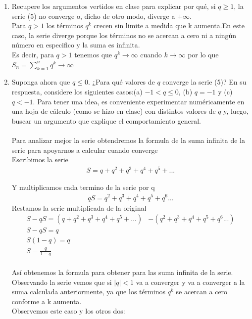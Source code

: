 \documentclass[12pt]{article}
\begin{document}
    \begin{enumerate}
    
        \item Recupere los argumentos vertidos en clase para explicar por qué, si $q \geq 1$, la serie (5) no converge o, dicho de otro modo, diverge a $+\infty$.\\
            Para $q>1$ los términos $q^k$ crecen sin limite a medida que k aumenta.En este caso, la serie diverge porque los términos no se acercan a cero ni a ningún número en especifico y la suma es infinita.\\
Es decir, para $q>1$ tenemos que $q^k \rightarrow \infty$ cuando $k\rightarrow \infty$ por lo que $S_n = \sum_{k=1}^{n} q^k \rightarrow \infty$
    

        \item Suponga ahora que $q \leq 0$. ¿Para qué valores de $q$ converge la serie (5)? En su respuesta, considere los siguientes casos:(a) $-1 < q \leq 0$, (b) $q = -1$ y (c)$q < -1$. Para tener una idea, es conveniente experimentar numéricamente en una hoja de cálculo (como se hizo en clase) con distintos valores de $q$ y, luego, buscar un argumento que explique el comportamiento general.\\
     \\ Para analizar mejor la serie obtendremos la formula de la suma infinita de la serie para apoyarnos a calcular cuando converge \\ 
    Escribimos la serie 
    \begin{eqnarray*}
        S=  q + q^2 + q^3+ q^4+ q^5+ ...
    \end{eqnarray*}
    
    Y multiplicamos cada termino de la serie por q
    \begin{eqnarray*}
           q S= q^2 + q^3+ q^4+ q^5+ q^6 ...
    \end{eqnarray*}
    Restamos la serie multiplicada de la original\\
    \begin{eqnarray*}
   S- qS =  (q + q^2 + q^3+ q^4+ q^5+ ...)& -  (q^2 + q^3+ q^4+ q^5+ q^6 ...)   \\
         S- qS= q \\
       S(1-q)=q \\
       S= \frac{q}{1-q}         
    \end{eqnarray*}\\

Así obtenemos la formula para obtener para las suma infinita de la serie.\\
 Observando la serie vemos que si $|q|<1$ va a converger y va a converger a la suma calculada anteriormente, ya que los  términos $q^k$  se acercan a cero conforme a k aumenta.\\
Observemos este caso y los otros dos:


\end{enumerate}
\end{document}
